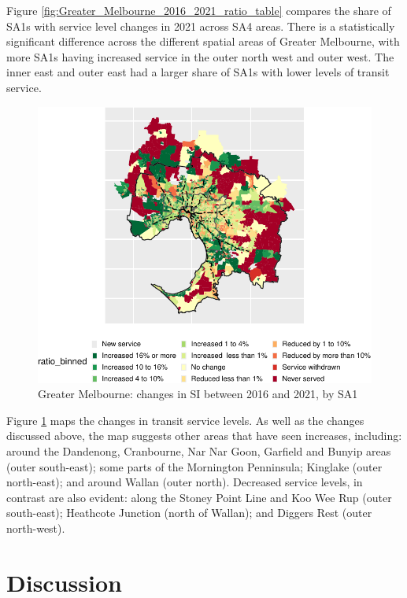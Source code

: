 \documentclass[preprint, 3p,
authoryear]{elsarticle} %
\begin{document}
Figure \ref{fig:Greater_Melbourne_2016_2021_ratio_table} compares the
share of SA1s with service level changes in 2021 across SA4 areas. There
is a statistically significant difference across the different spatial
areas of Greater Melbourne, with more SA1s having increased service in
the outer north west and outer west. The inner east and outer east had a
larger share of SA1s with lower levels of transit service.

\begin{figure}
\includegraphics[width=0.9\linewidth]{Leveraging_GTFS_to_assess_transit_supply_Transport_Geography_files/figure-latex/Greater_Melbourne_2016_2021_ratio_map-1} \caption{Greater Melbourne: changes in SI between 2016 and 2021, by SA1}\label{fig:Greater_Melbourne_2016_2021_ratio_map}
\end{figure}

Figure \ref{fig:Greater_Melbourne_2016_2021_ratio_map} maps the changes
in transit service levels. As well as the changes discussed above, the
map suggests other areas that have seen increases, including: around the
Dandenong, Cranbourne, Nar Nar Goon, Garfield and Bunyip areas (outer
south-east); some parts of the Mornington Penninsula; Kinglake (outer
north-east); and around Wallan (outer north). Decreased service levels,
in contrast are also evident: along the Stoney Point Line and Koo Wee
Rup (outer south-east); Heathcote Junction (north of Wallan); and
Diggers Rest (outer north-west).

\section{Discussion}\label{discussion}
\end{document}
